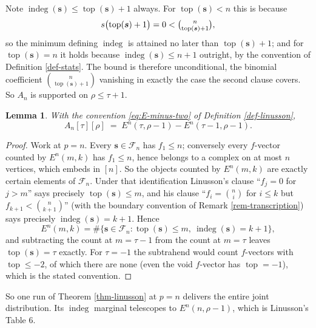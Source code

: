 \documentclass[11pt, a4paper, abstract=yes]{scrartcl}
\theoremstyle{definition}
\theoremstyle{remark}
\theoremstyle{plain}
\newtheorem{lemma}[definition]{Lemma}
\newcommand{\vek}[1]{\boldsymbol{#1}}
\newcommand{\indeg}{\operatorname{indeg}}
\newcommand{\tp}{\operatorname{top}}
\begin{document}
Note \(\indeg(\vek s)\le\tp(\vek s)+1\) always. For \(\tp(\vek s)<n\) this is because
\begin{equation}\label{eq:indeg-le-top}
  s\bigl(\tp(\vek s)+1\bigr)=0<\tbinom n{\tp(\vek s)+1},
\end{equation}
so the minimum defining \(\indeg\) is attained no later
than \(\tp(\vek s)+1\); and for \(\tp(\vek s)=n\) it holds because \(\indeg(\vek s)\le n+1\) outright, by
the convention of Definition \ref{def-stats}. The bound is therefore unconditional, the binomial
coefficient \(\binom n{\tp(\vek s)+1}\) vanishing in exactly the case the second clause covers. So
\(A_n\) is supported on \(\rho\le\tau+1\).

\begin{lemma}
With the convention \eqref{eq:E-minus-two} of Definition \ref{def-linusson},
\begin{equation}\label{eq:auto-12}
  A_n[\tau][\rho]\;=\;E^n(\tau,\rho-1)-E^n(\tau-1,\rho-1).
\end{equation}
\label{lem-joint}
\end{lemma}

\begin{proof}
Work at \(p=n\). Every \(\vek s\in\mathcal F_n\) has \(f_1\le n\); conversely every \(f\)-vector counted by
\(E^n(m,k)\) has \(f_1\le n\), hence belongs to a complex on at most \(n\) vertices, which embeds in
\([n]\). So the objects counted by \(E^n(m,k)\) are exactly certain elements of \(\mathcal F_n\).
Under that identification Linusson's clause ``\(f_j=0\) for \(j>m\)'' says precisely \(\tp(\vek s)\le m\),
and his clause ``\(f_i=\binom ni\) for \(i\le k\) but \(f_{k+1}<\binom n{k+1}\)'' (with the boundary
convention of Remark \ref{rem-transcription}) says precisely \(\indeg(\vek s)=k+1\). Hence
\[
  E^n(m,k)=\#\lbrace \vek s\in\mathcal F_n:\tp(\vek s)\le m,\ \indeg(\vek s)=k+1\rbrace ,
\]
and subtracting the count at \(m=\tau-1\) from the count at \(m=\tau\) leaves \(\tp(\vek s)=\tau\)
exactly. For \(\tau=-1\) the subtrahend would count \(f\)-vectors with \(\tp\le-2\), of which there
are none (even the void \(f\)-vector has \(\tp=-1\)), which is the stated convention.
\end{proof}

So one run of Theorem \ref{thm-linusson} at \(p=n\) delivers the entire joint distribution. Its
\(\indeg\) marginal telescopes to \(E^n(n,\rho-1)\), which is Linusson's Table 6.
\end{document}
